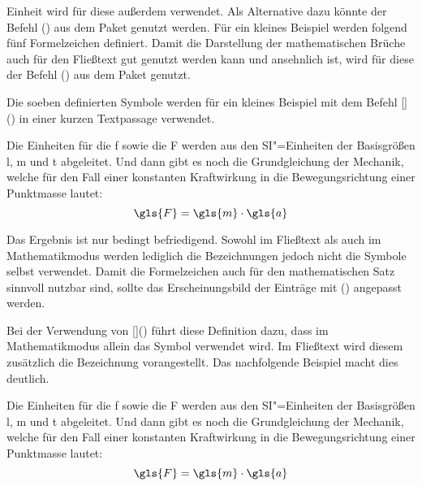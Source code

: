 \documentclass[%
  english,ngerman,%
  cdgeometry=no,DIV=12,automark%
]{tudscrartcl}
\begin{document}
Einheit wird für diese außerdem  verwendet. Als Alternative dazu 
könnte der Befehl () aus dem Paket  
genutzt werden. Für ein kleines Beispiel werden folgend fünf Formelzeichen 
definiert. Damit die Darstellung der mathematischen Brüche auch für den 
Fließtext gut genutzt werden kann und ansehnlich ist, wird für diese der Befehl 
() aus dem Paket  genutzt.
%
\begin{Trunk*}

\end{Trunk*}
%
Die soeben definierten Symbole werden für ein kleines Beispiel mit dem Befehl 
[]() in einer kurzen 
Textpassage verwendet.
%
\begin{Hint*}
Die Einheiten für die \gls{f} sowie die \gls{F} werden aus den 
SI"=Einheiten der Basisgrößen \gls{l}, \gls{m} und \gls{t} abgeleitet.
Und dann gibt es noch die Grundgleichung der Mechanik, welche für den
Fall einer konstanten Kraftwirkung in die Bewegungsrichtung einer
Punktmasse lautet:
\[\gls{F} = \gls{m} \cdot \gls{a}\]
\end{Hint*}
%
Das Ergebnis ist nur bedingt befriedigend. Sowohl im Fließtext als auch im 
Mathematikmodus werden lediglich die Bezeichnungen jedoch nicht die Symbole 
selbst verwendet. Damit die Formelzeichen auch für den mathematischen Satz 
sinnvoll nutzbar sind, sollte das Erscheinungsbild der Einträge mit 
() angepasst werden.
%
\begin{Preamble*}
\end{Preamble*}
%
Bei der Verwendung von []() 
führt diese Definition dazu, dass im Mathematikmodus allein das Symbol 
verwendet wird. Im Fließtext wird diesem zusätzlich die Bezeichnung 
vorangestellt. Das nachfolgende Beispiel macht dies deutlich.
%
\begin{Trunk*}
Die Einheiten für die \gls{f} sowie die \gls{F} werden aus den
SI"=Einheiten der Basisgrößen \gls{l}, \gls{m} und \gls{t} abgeleitet.
Und dann gibt es noch die Grundgleichung der Mechanik, welche für den
Fall einer konstanten Kraftwirkung in die Bewegungsrichtung einer
Punktmasse lautet:
\[\gls{F} = \gls{m} \cdot \gls{a}\]

\end{Trunk*}
\end{document}

